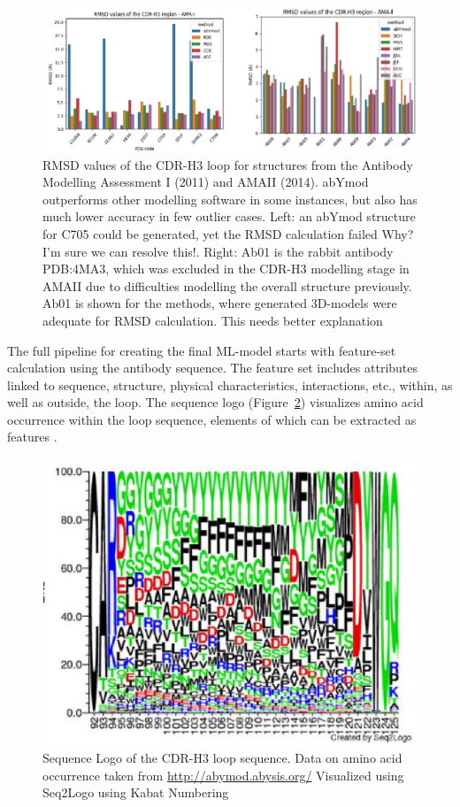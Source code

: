 \documentclass[12pt]{article}
\newcommand{\lilian}[1]{ {\color{red}{\bfseries Lilian:} #1}}
\begin{document}
\begin{figure}
  \centering
  \includegraphics[width=\linewidth]{AMA.eps}
  \caption {RMSD values of the CDR-H3 loop for structures from the
    Antibody Modelling Assessment I (2011) and AMAII (2014). abYmod
    outperforms other modelling software in some instances, but also
    has much lower accuracy in few outlier cases. Left: an abYmod
    structure for C705 could be generated, yet the RMSD calculation
    failed \lilian{Why? I'm sure we can resolve this!}.
    Right: Ab01 is the rabbit antibody PDB:4MA3, which was
    excluded in the CDR-H3 modelling stage in AMAII due to
    difficulties modelling the overall structure previously. Ab01 is
    shown for the methods, where generated 3D-models were adequate for
    RMSD calculation. \lilian{This needs better explanation}}
  \label{fig:AMA}
\end{figure}

The full pipeline for creating the final ML-model
starts with 
feature-set calculation using the antibody sequence. The feature set
includes attributes linked to sequence, structure, physical
characteristics, interactions, etc., within, as well as outside, the
loop. 
The sequence logo (Figure~\ref{fig:logo}) visualizes amino acid
occurrence within the loop sequence, elements of which can be
extracted as features \cite{Thomsen2012,Shaner1993}.

\begin{figure}
  \centering
  \includegraphics[width=\linewidth]{logo.eps}
  \caption {Sequence Logo of the CDR-H3 loop sequence. Data on amino
    acid occurrence taken from \protect\url{http://abymod.abysis.org/} Visualized
    using Seq2Logo using Kabat Numbering}
  \label{fig:logo}
\end{figure}
\end{document}
